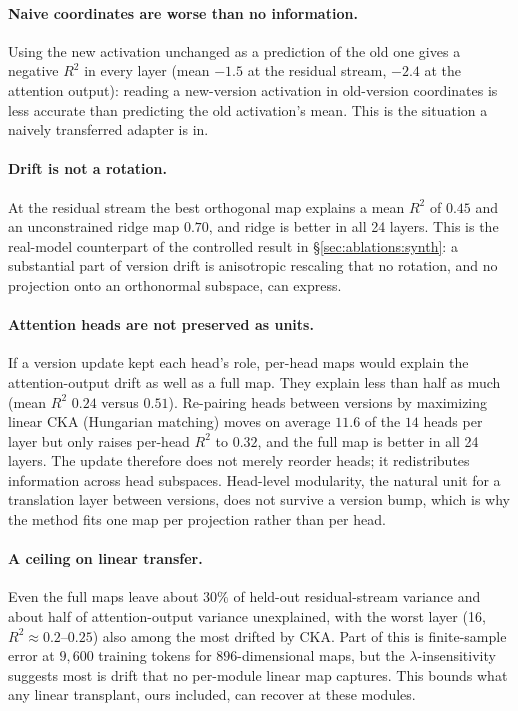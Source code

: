 \paragraph{Naive coordinates are worse than no information.}
Using the new activation unchanged as a prediction of the old one gives a
negative $R^2$ in every layer (mean $-1.5$ at the residual stream, $-2.4$ at
the attention output): reading a new-version activation in old-version
coordinates is less accurate than predicting the old activation's mean. This
is the situation a naively transferred adapter is in.

\paragraph{Drift is not a rotation.}
At the residual stream the best orthogonal map explains a mean $R^2$ of $0.45$
and an unconstrained ridge map $0.70$, and ridge is better in all 24 layers.
This is the real-model counterpart of the controlled result in
\S\ref{sec:ablations:synth}: a substantial part of version drift is
anisotropic rescaling that no rotation, and no projection onto an orthonormal
subspace, can express.

\paragraph{Attention heads are not preserved as units.}
If a version update kept each head's role, per-head maps would explain the
attention-output drift as well as a full map. They explain less than half as
much (mean $R^2$ $0.24$ versus $0.51$). Re-pairing heads between versions by
maximizing linear CKA (Hungarian matching) moves on average $11.6$ of the $14$
heads per layer but only raises per-head $R^2$ to $0.32$, and the full map is
better in all 24 layers. The update therefore does not merely reorder heads; it
redistributes information across head subspaces. Head-level modularity, the
natural unit for a translation layer between versions, does not survive a
version bump, which is why the method fits one map per projection rather than
per head.

\paragraph{A ceiling on linear transfer.}
Even the full maps leave about $30\%$ of held-out residual-stream variance and
about half of attention-output variance unexplained, with the worst layer
(16, $R^2\approx0.2$--$0.25$) also among the most drifted by CKA. Part of this
is finite-sample error at $9{,}600$ training tokens for $896$-dimensional maps,
but the $\lambda$-insensitivity suggests most is drift that no per-module linear
map captures. This bounds what any linear transplant, ours included, can
recover at these modules.

